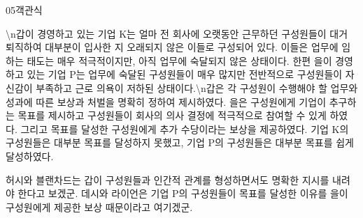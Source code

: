 \documentclass[fs85,seriesWit]{korfarm-base}
\begin{document}
\begin{kfQBlock}{05}{객관식}
\begin{kfEvidence}\textbackslash{}n갑이 경영하고 있는 기업 K는 얼마 전 회사에 오랫동안 근무하던 구성원들이 대거 퇴직하여 대부분이 입사한 지 오래되지 않은 이들로 구성되어 있다. 이들은 업무에 임하는 태도는 매우 적극적이지만, 아직 업무에 숙달되지 않은 상태이다. 한편 을이 경영하고 있는 기업 P는 업무에 숙달된 구성원들이 매우 많지만 전반적으로 구성원들이 자신감이 부족하고 근로 의욕이 저하된 상태이다.\textbackslash{}n갑은 각 구성원이 수행해야 할 업무와 성과에 따른 보상과 처벌을 명확히 정하여 제시하였다. 을은 구성원에게 기업이 추구하는 목표를 제시하고 구성원들이 회사의 의사 결정에 적극적으로 참여할 수 있게 하였다. 그리고 목표를 달성한 구성원에게 추가 수당이라는 보상을 제공하였다. 기업 K의 구성원들은 대부분 목표를 달성하지 못했고, 기업 P의 구성원들은 대부분 목표를 쉽게 달성하였다.\end{kfEvidence}
\begin{kfChoices}
\kfChoice 허시와 블랜차드는 갑이 구성원들과 인간적 관계를 형성하면서도 명확한 지시를 내려야 한다고 보겠군.
\kfChoice 데시와 라이언은 기업 P의 구성원들이 목표를 달성한 이유를 을이 구성원에게 제공한 보상 때문이라고 여기겠군.
\end{kfChoices}
\end{kfQBlock}
\end{document}
